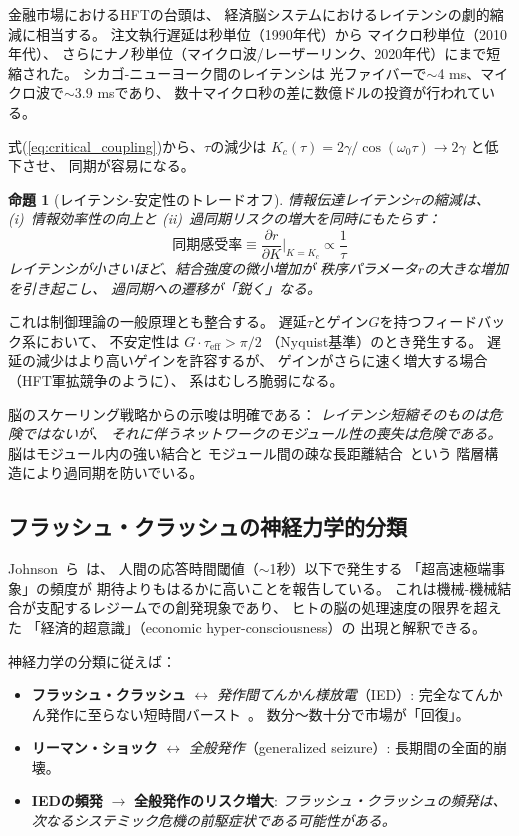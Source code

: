 \documentclass[12pt,twocolumn]{ltjsarticle}
\newtheorem{proposition}[theorem]{命題}
\begin{document}
金融市場におけるHFTの台頭は、
経済脳システムにおけるレイテンシの劇的縮減に相当する。
注文執行遅延は秒単位（1990年代）から
マイクロ秒単位（2010年代）、
さらにナノ秒単位（マイクロ波/レーザーリンク、2020年代）にまで短縮された。
シカゴ-ニューヨーク間のレイテンシは
光ファイバーで$\sim$4 ms、マイクロ波で$\sim$3.9 msであり、
数十マイクロ秒の差に数億ドルの投資が行われている。

式(\ref{eq:critical_coupling})から、$\tau$の減少は
$K_c(\tau) = 2\gamma/\cos(\omega_0\tau) \to 2\gamma$ と低下させ、
同期が容易になる。

\begin{proposition}[レイテンシ-安定性のトレードオフ]
\label{prop:latency}
情報伝達レイテンシ$\tau$の縮減は、
(i)~情報効率性の向上と
(ii)~過同期リスクの増大を同時にもたらす：
\begin{equation}
\text{同期感受率} \equiv \frac{\partial r}{\partial K}
\bigg|_{K=K_c} \propto \frac{1}{\tau}
\end{equation}
レイテンシが小さいほど、結合強度の微小増加が
秩序パラメータ$r$の大きな増加を引き起こし、
過同期への遷移が「鋭く」なる。
\end{proposition}

これは制御理論の一般原理とも整合する。
遅延$\tau$とゲイン$G$を持つフィードバック系において、
不安定性は $G \cdot \tau_{\text{eff}} > \pi/2$
（Nyquist基準）のとき発生する。
遅延の減少はより高いゲインを許容するが、
ゲインがさらに速く増大する場合
（HFT軍拡競争のように）、
系はむしろ脆弱になる。

脳のスケーリング戦略からの示唆は明確である：
\emph{レイテンシ短縮そのものは危険ではないが、
それに伴うネットワークのモジュール性の喪失は危険である。}
脳はモジュール内の強い結合と
モジュール間の疎な長距離結合~\cite{Sporns2004}という
階層構造により過同期を防いでいる。

\subsection{フラッシュ・クラッシュの神経力学的分類}

Johnson~ら~\cite{Johnson2013}は、
人間の応答時間閾値（$\sim$1秒）以下で発生する
「超高速極端事象」の頻度が
期待よりもはるかに高いことを報告している。
これは機械-機械結合が支配するレジームでの創発現象であり、
ヒトの脳の処理速度の限界を超えた
「経済的超意識」（economic hyper-consciousness）の
出現と解釈できる。

神経力学の分類に従えば：

\begin{itemize}
\item \textbf{フラッシュ・クラッシュ} $\leftrightarrow$
\emph{発作間てんかん様放電}（IED）:
完全なてんかん発作に至らない短時間バースト~\cite{Staley2005}。
数分〜数十分で市場が「回復」。

\item \textbf{リーマン・ショック} $\leftrightarrow$
\emph{全般発作}（generalized seizure）:
長期間の全面的崩壊。

\item \textbf{IEDの頻発} $\to$ \textbf{全般発作のリスク増大}:
\emph{フラッシュ・クラッシュの頻発は、
次なるシステミック危機の前駆症状である可能性がある。}
\end{itemize}
\end{document}
